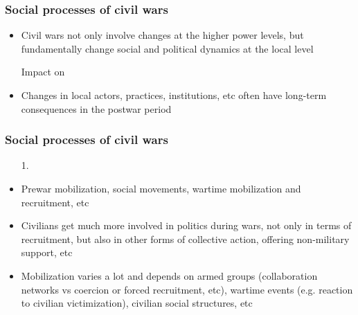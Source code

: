 \documentclass[aspectratio=43]{beamer}
\begin{document}
\begin{frame}
\frametitle{Social processes of civil wars}
\centering

\begin{itemize}[<+->]
  \item Civil wars not only involve changes at the higher power levels, but fundamentally change social and political dynamics at the local level
  \item[] Impact on {}
  \item[]
  \item Changes in local actors, practices, institutions, etc often have long-term consequences in the postwar period
\end{itemize}

\end{frame}

\begin{frame}
\frametitle{Social processes of civil wars}
\centering

\begin{itemize}[<+->]
  \item[1.] {\color{red}{Political mobilization}}
  \item Prewar mobilization, social movements, wartime mobilization and recruitment, etc
  \item Civilians get much more involved in politics during wars, not only in terms of recruitment, but also in other forms of collective action, offering non-military support, etc
  \item Mobilization varies a lot and depends on armed groups (collaboration networks vs coercion or forced recruitment, etc), wartime events (e.g. reaction to civilian victimization), civilian social structures, etc
\end{itemize}

\end{frame}
\end{document}
